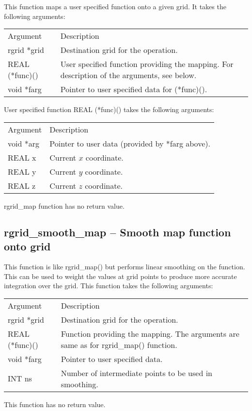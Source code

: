 \documentclass[12pt,letterpaper]{report}
\begin{document}
This function maps a user specified function onto a given grid. It takes the following arguments:
\begin{longtable}{p{} p{}}
Argument & Description\\
\cline{1-2}
rgrid *grid & Destination grid for the operation.\\
REAL (*func)() & User specified function providing the mapping. For description of the arguments, see below.\\
void *farg & Pointer to user specified data for (*func)().\\
\end{longtable}
User specified function REAL (*func)() takes the following arguments:
\begin{longtable}{p{} p{}}
Argument & Description\\
\cline{1-2}
void *arg & Pointer to user data (provided by *farg above).\\
REAL x & Current $x$ coordinate.\\
REAL y & Current $y$ coordinate.\\
REAL z & Current $z$ coordinate.\\
\end{longtable}
\noindent
rgrid\_map function has no return value.

\subsection{rgrid\_smooth\_map -- Smooth map function onto grid}

This function is like rgrid\_map() but performs linear smoothing on the function. This can be used to weight the values at grid points to produce more accurate integration over the grid. This function takes the following arguments:
\begin{longtable}{p{} p{}}
Argument & Description\\
\cline{1-2}
rgrid *grid & Destination grid for the operation.\\
REAL (*func)() & Function providing the mapping. The arguments are same as for rgrid\_map() function.\\
void *farg & Pointer to user specified data.\\
INT ns & Number of intermediate points to be used in smoothing.\\
\end{longtable}
\noindent
This function has no return value.
\end{document}
